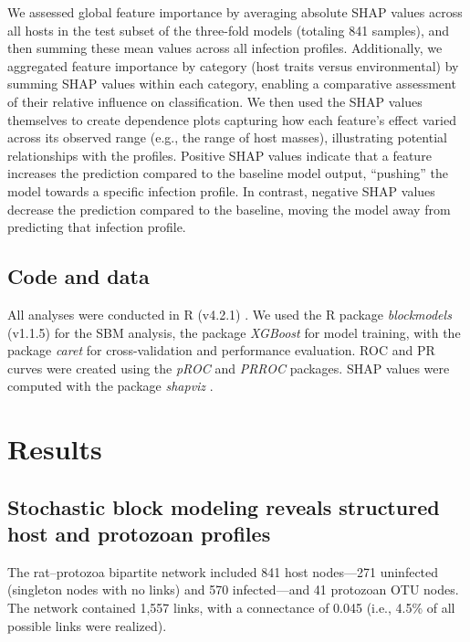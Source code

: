 \documentclass[oneside, a4paper, onecolumn, 11pt]{article}
\begin{document}
We assessed global feature importance by averaging absolute SHAP values across all hosts in the test subset of the three-fold models (totaling 841 samples), and then summing these mean values across all infection profiles. Additionally, we aggregated feature importance by category (host traits versus environmental) by summing SHAP values within each category, enabling a comparative assessment of their relative influence on classification. We then used the SHAP values themselves to create dependence plots capturing how each feature’s effect varied across its observed range (e.g., the range of host masses), illustrating potential relationships with the profiles. Positive SHAP values indicate that a feature increases the prediction compared to the baseline model output, ``pushing'' the model towards a specific infection profile. In contrast, negative SHAP values decrease the prediction compared to the baseline, moving the model away from predicting that infection profile.

\subsection*{Code and data}
All analyses were conducted in R (v4.2.1) \citep{R-Core-Team2024-fg}. We used the R package \textit{blockmodels} (v1.1.5) \citep{Leger2016-ab} for the SBM analysis, the package \textit{XGBoost} \citep{Chen2016-ev} for model training, with the package \textit{caret} \citep{Kuhn2008-kd} for cross-validation and performance evaluation. ROC and PR curves were created using the \textit{pROC} \citep{Robin2011-vr} and \textit{PRROC} \citep{Grau2015-sw} packages. SHAP values were computed with the package \textit{shapviz} \citep{Mayer2025-vk}. 

\section*{Results}

\subsection*{Stochastic block modeling reveals structured host and protozoan profiles}
The rat–protozoa bipartite network included 841 host nodes---271 uninfected (singleton nodes with no links) and 570 infected---and 41 protozoan OTU nodes. The network contained 1,557 links, with a connectance of 0.045 (i.e., 4.5\% of all possible links were realized).
\end{document}
